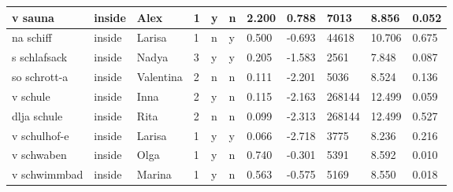\begin{longtable}{|p{4cm}|p{1cm}|p{1.2cm}|p{0.5cm}|p{0.5cm}|p{0.5cm}|R{1cm}|R{1cm}|R{1cm}|R{1cm}|R{1cm}|}
v sauna                    & inside            & Alex          & 1                                   & y                          & n                          & 2.200      & 0.788         & 7013                    & 8.856                         & 0.052                   \\ \hline
na schiff                  & inside            & Larisa        & 1                                   & n                          & y                          & 0.500      & -0.693        & 44618                   & 10.706                        & 0.675                   \\ \hline
s schlafsack               & inside            & Nadya         & 3                                   & y                          & y                          & 0.205      & -1.583        & 2561                    & 7.848                         & 0.087                   \\ \hline
so schrott-a               & inside            & Valentina     & 2                                   & n                          & n                          & 0.111      & -2.201        & 5036                    & 8.524                         & 0.136                   \\ \hline
v schule                   & inside            & Inna          & 2                                   & y                          & n                          & 0.115      & -2.163        & 268144                  & 12.499                        & 0.059                   \\ \hline
dlja schule                & inside            & Rita          & 2                                   & n                          & n                          & 0.099      & -2.313        & 268144                  & 12.499                        & 0.527                   \\ \hline
v schulhof-e               & inside            & Larisa        & 1                                   & y                          & y                          & 0.066      & -2.718        & 3775                    & 8.236                         & 0.216                   \\ \hline
v schwaben                 & inside            & Olga          & 1                                   & y                          & n                          & 0.740      & -0.301        & 5391                    & 8.592                         & 0.010                   \\ \hline
v schwimmbad               & inside            & Marina        & 1                                   & y                          & n                          & 0.563      & -0.575        & 5169                    & 8.550                         & 0.018                   \\ \hline

\end{longtable}
